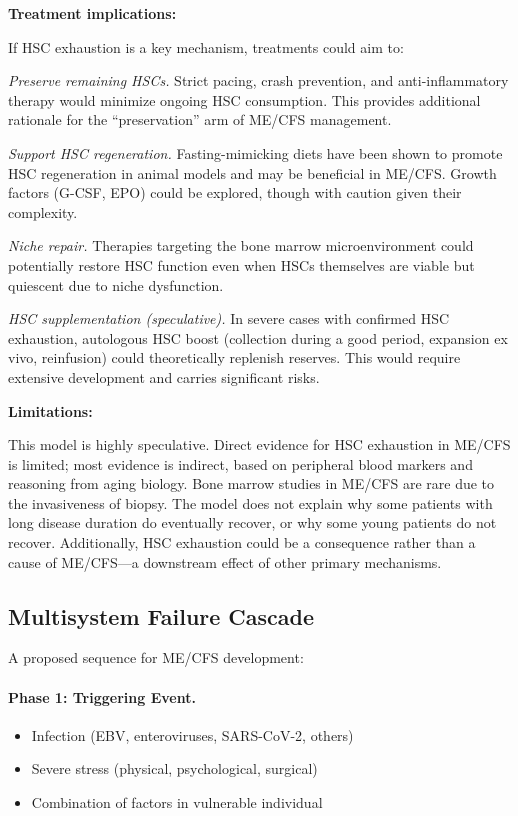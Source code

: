 \begin{speculation}
\textbf{Treatment implications:}

If HSC exhaustion is a key mechanism, treatments could aim to:

\textit{Preserve remaining HSCs.} Strict pacing, crash prevention, and anti-inflammatory therapy would minimize ongoing HSC consumption. This provides additional rationale for the ``preservation'' arm of ME/CFS management.

\textit{Support HSC regeneration.} Fasting-mimicking diets have been shown to promote HSC regeneration in animal models and may be beneficial in ME/CFS. Growth factors (G-CSF, EPO) could be explored, though with caution given their complexity.

\textit{Niche repair.} Therapies targeting the bone marrow microenvironment could potentially restore HSC function even when HSCs themselves are viable but quiescent due to niche dysfunction.

\textit{HSC supplementation (speculative).} In severe cases with confirmed HSC exhaustion, autologous HSC boost (collection during a good period, expansion ex vivo, reinfusion) could theoretically replenish reserves. This would require extensive development and carries significant risks.

\textbf{Limitations:}

This model is highly speculative. Direct evidence for HSC exhaustion in ME/CFS is limited; most evidence is indirect, based on peripheral blood markers and reasoning from aging biology. Bone marrow studies in ME/CFS are rare due to the invasiveness of biopsy. The model does not explain why some patients with long disease duration do eventually recover, or why some young patients do not recover. Additionally, HSC exhaustion could be a consequence rather than a cause of ME/CFS---a downstream effect of other primary mechanisms.
\end{speculation}

\subsection{Multisystem Failure Cascade}

A proposed sequence for ME/CFS development:

\paragraph{Phase 1: Triggering Event.}
\begin{itemize}
    \item Infection (EBV, enteroviruses, SARS-CoV-2, others)
    \item Severe stress (physical, psychological, surgical)
    \item Combination of factors in vulnerable individual
\end{itemize}

